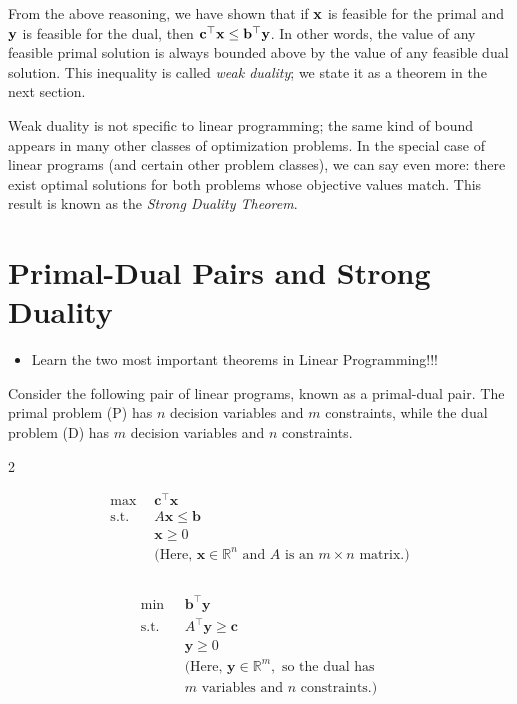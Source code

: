 From the above reasoning, we have shown that if $\mathbf{x}$ is feasible for the primal and $\mathbf{y}$ is feasible for the dual, then $\mathbf{c}^\top \mathbf{x} \leq \mathbf{b}^\top \mathbf{y}$. In other words, the value of any feasible primal solution is always bounded above by the value of any feasible dual solution. This inequality is called \emph{weak duality}; we state it as a theorem in the next section.

Weak duality is not specific to linear programming; the same kind of bound appears in many other classes of optimization problems. In the special case of linear programs (and certain other problem classes), we can say even more: there exist optimal solutions for both problems whose objective values match. This result is known as the \emph{Strong Duality Theorem}.

\section{Primal-Dual Pairs and Strong Duality}
\label{sec:duality-strong}
\begin{outcome}
\begin{itemize}
\item Learn the two most important theorems in Linear Programming!!!
\end{itemize}
\end{outcome}
Consider the following pair of linear programs, known as a primal-dual pair. The primal problem (P) has $n$ decision variables and $m$ constraints, while the dual problem (D) has $m$ decision variables and $n$ constraints.
\begin{multicols}{2}
\begin{tcolorbox}[title=Primal (P), colback=blue!5, colframe=blue!60!black, sharp corners=south]
\[
\begin{aligned}
\max\ & \mathbf{c}^\top \mathbf{x} \\
\text{s.t.} \quad & A \mathbf{x} \leq \mathbf{b} \\
& \mathbf{x} \geq 0 \\
& \text{(Here, } \mathbf{x} \in \mathbb{R}^n \text{ and } A \text{ is an } m \times n \text{ matrix.)}
\\
\phantom{} \\
\end{aligned}
\]
\end{tcolorbox}

\columnbreak

\begin{tcolorbox}[title=Dual (D), colback=green!5, colframe=green!60!black, sharp corners=south]
\[
\begin{aligned}
\min\ & \mathbf{b}^\top \mathbf{y} \\
\text{s.t.} \quad & A^\top \mathbf{y} \geq \mathbf{c} \\
& \mathbf{y} \geq 0 \\
& \text{(Here, } \mathbf{y} \in \mathbb{R}^m, \text{ so the dual has } \\
& m \text{ variables and } n \text{ constraints.)}
\end{aligned}
\]
\end{tcolorbox}
\end{multicols}

